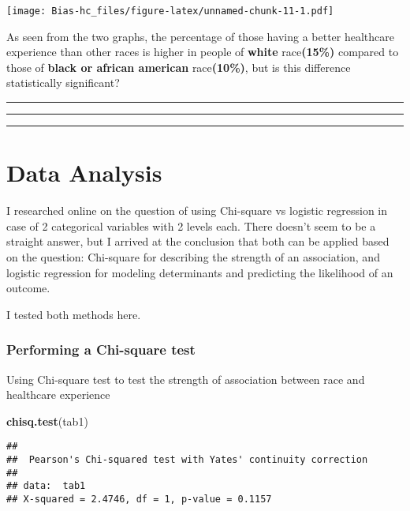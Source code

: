 \documentclass[]{article}
\newenvironment{Shaded}{\begin{snugshade}}{\end{snugshade}}
\newcommand{\KeywordTok}[1]{\textcolor[rgb]{0.13,0.29,0.53}{\textbf{#1}}}
\newcommand{\NormalTok}[1]{#1}
\begin{document}
\texttt{[image: Bias-hc\_files/figure-latex/unnamed-chunk-11-1.pdf]}

As seen from the two graphs, the percentage of those having a better
healthcare experience than other races is higher in people of
\textbf{white} race\textbf{(15\%)} compared to those of \textbf{black or
african american} race\textbf{(10\%)}, but is this difference
statistically significant?

\begin{center}\rule{0.5\linewidth}{\linethickness}\end{center}

\begin{center}\rule{0.5\linewidth}{\linethickness}\end{center}

\begin{center}\rule{0.5\linewidth}{\linethickness}\end{center}

\hypertarget{data-analysis}{%
\section{Data Analysis}\label{data-analysis}}

I researched online on the question of using Chi-square vs logistic
regression in case of 2 categorical variables with 2 levels each. There
doesn't seem to be a straight answer, but I arrived at the conclusion
that both can be applied based on the question: Chi-square for
describing the strength of an association, and logistic regression for
modeling determinants and predicting the likelihood of an outcome.

I tested both methods here.

\hypertarget{performing-a-chi-square-test}{%
\subsubsection{Performing a Chi-square
test}\label{performing-a-chi-square-test}}

Using Chi-square test to test the strength of association between race
and healthcare experience

\begin{Shaded}
\begin{Highlighting}[]
\KeywordTok{chisq.test}\NormalTok{(tab1)}
\end{Highlighting}
\end{Shaded}

\begin{verbatim}
## 
##  Pearson's Chi-squared test with Yates' continuity correction
## 
## data:  tab1
## X-squared = 2.4746, df = 1, p-value = 0.1157
\end{verbatim}
\end{document}
